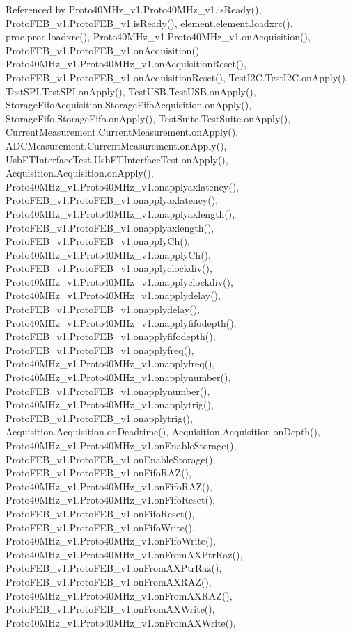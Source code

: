 Referenced by Proto40\+M\+Hz\+\_\+v1.\+Proto40\+M\+Hz\+\_\+v1.\+is\+Ready(), Proto\+F\+E\+B\+\_\+v1.\+Proto\+F\+E\+B\+\_\+v1.\+is\+Ready(), element.\+element.\+loadxrc(), proc.\+proc.\+loadxrc(), Proto40\+M\+Hz\+\_\+v1.\+Proto40\+M\+Hz\+\_\+v1.\+on\+Acquisition(), Proto\+F\+E\+B\+\_\+v1.\+Proto\+F\+E\+B\+\_\+v1.\+on\+Acquisition(), Proto40\+M\+Hz\+\_\+v1.\+Proto40\+M\+Hz\+\_\+v1.\+on\+Acquisition\+Reset(), Proto\+F\+E\+B\+\_\+v1.\+Proto\+F\+E\+B\+\_\+v1.\+on\+Acquisition\+Reset(), Test\+I2\+C.\+Test\+I2\+C.\+on\+Apply(), Test\+S\+P\+I.\+Test\+S\+P\+I.\+on\+Apply(), Test\+U\+S\+B.\+Test\+U\+S\+B.\+on\+Apply(), Storage\+Fifo\+Acquisition.\+Storage\+Fifo\+Acquisition.\+on\+Apply(), Storage\+Fifo.\+Storage\+Fifo.\+on\+Apply(), Test\+Suite.\+Test\+Suite.\+on\+Apply(), Current\+Measurement.\+Current\+Measurement.\+on\+Apply(), A\+D\+C\+Measurement.\+Current\+Measurement.\+on\+Apply(), Usb\+F\+T\+Interface\+Test.\+Usb\+F\+T\+Interface\+Test.\+on\+Apply(), Acquisition.\+Acquisition.\+on\+Apply(), Proto40\+M\+Hz\+\_\+v1.\+Proto40\+M\+Hz\+\_\+v1.\+onapplyaxlatency(), Proto\+F\+E\+B\+\_\+v1.\+Proto\+F\+E\+B\+\_\+v1.\+onapplyaxlatency(), Proto40\+M\+Hz\+\_\+v1.\+Proto40\+M\+Hz\+\_\+v1.\+onapplyaxlength(), Proto\+F\+E\+B\+\_\+v1.\+Proto\+F\+E\+B\+\_\+v1.\+onapplyaxlength(), Proto\+F\+E\+B\+\_\+v1.\+Proto\+F\+E\+B\+\_\+v1.\+onapply\+Ch(), Proto40\+M\+Hz\+\_\+v1.\+Proto40\+M\+Hz\+\_\+v1.\+onapply\+Ch(), Proto\+F\+E\+B\+\_\+v1.\+Proto\+F\+E\+B\+\_\+v1.\+onapplyclockdiv(), Proto40\+M\+Hz\+\_\+v1.\+Proto40\+M\+Hz\+\_\+v1.\+onapplyclockdiv(), Proto40\+M\+Hz\+\_\+v1.\+Proto40\+M\+Hz\+\_\+v1.\+onapplydelay(), Proto\+F\+E\+B\+\_\+v1.\+Proto\+F\+E\+B\+\_\+v1.\+onapplydelay(), Proto40\+M\+Hz\+\_\+v1.\+Proto40\+M\+Hz\+\_\+v1.\+onapplyfifodepth(), Proto\+F\+E\+B\+\_\+v1.\+Proto\+F\+E\+B\+\_\+v1.\+onapplyfifodepth(), Proto\+F\+E\+B\+\_\+v1.\+Proto\+F\+E\+B\+\_\+v1.\+onapplyfreq(), Proto40\+M\+Hz\+\_\+v1.\+Proto40\+M\+Hz\+\_\+v1.\+onapplyfreq(), Proto40\+M\+Hz\+\_\+v1.\+Proto40\+M\+Hz\+\_\+v1.\+onapplynumber(), Proto\+F\+E\+B\+\_\+v1.\+Proto\+F\+E\+B\+\_\+v1.\+onapplynumber(), Proto40\+M\+Hz\+\_\+v1.\+Proto40\+M\+Hz\+\_\+v1.\+onapplytrig(), Proto\+F\+E\+B\+\_\+v1.\+Proto\+F\+E\+B\+\_\+v1.\+onapplytrig(), Acquisition.\+Acquisition.\+on\+Deadtime(), Acquisition.\+Acquisition.\+on\+Depth(), Proto40\+M\+Hz\+\_\+v1.\+Proto40\+M\+Hz\+\_\+v1.\+on\+Enable\+Storage(), Proto\+F\+E\+B\+\_\+v1.\+Proto\+F\+E\+B\+\_\+v1.\+on\+Enable\+Storage(), Proto\+F\+E\+B\+\_\+v1.\+Proto\+F\+E\+B\+\_\+v1.\+on\+Fifo\+R\+A\+Z(), Proto40\+M\+Hz\+\_\+v1.\+Proto40\+M\+Hz\+\_\+v1.\+on\+Fifo\+R\+A\+Z(), Proto40\+M\+Hz\+\_\+v1.\+Proto40\+M\+Hz\+\_\+v1.\+on\+Fifo\+Reset(), Proto\+F\+E\+B\+\_\+v1.\+Proto\+F\+E\+B\+\_\+v1.\+on\+Fifo\+Reset(), Proto\+F\+E\+B\+\_\+v1.\+Proto\+F\+E\+B\+\_\+v1.\+on\+Fifo\+Write(), Proto40\+M\+Hz\+\_\+v1.\+Proto40\+M\+Hz\+\_\+v1.\+on\+Fifo\+Write(), Proto40\+M\+Hz\+\_\+v1.\+Proto40\+M\+Hz\+\_\+v1.\+on\+From\+A\+X\+Ptr\+Raz(), Proto\+F\+E\+B\+\_\+v1.\+Proto\+F\+E\+B\+\_\+v1.\+on\+From\+A\+X\+Ptr\+Raz(), Proto\+F\+E\+B\+\_\+v1.\+Proto\+F\+E\+B\+\_\+v1.\+on\+From\+A\+X\+R\+A\+Z(), Proto40\+M\+Hz\+\_\+v1.\+Proto40\+M\+Hz\+\_\+v1.\+on\+From\+A\+X\+R\+A\+Z(), Proto\+F\+E\+B\+\_\+v1.\+Proto\+F\+E\+B\+\_\+v1.\+on\+From\+A\+X\+Write(), Proto40\+M\+Hz\+\_\+v1.\+Proto40\+M\+Hz\+\_\+v1.\+on\+From\+A\+X\+Write(), 